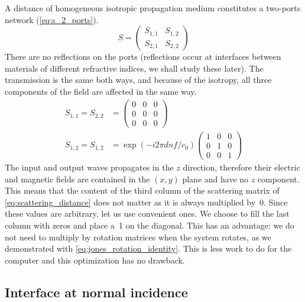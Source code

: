 A distance of homogeneous isotropic propagation medium constitutes a two-ports network (\cref{eq:s_2_ports}).
\begin{equation}
    S =
    \begin{pmatrix}
        S_{1, 1} & S_{1, 2} \\
        S_{2, 1} & S_{2, 2}
    \end{pmatrix}
    \label{eq:s_2_ports}
\end{equation}
There are no reflections on the ports (reflections occur at interfaces between materials of different refractive indices, we shall study these later).
The transmission is the same both ways, and because of the isotropy, all three components of the field are affected in the same way.
\begin{equation}
    \begin{aligned}
    S_{1, 1} = S_{2, 2} &=
    \begin{pmatrix}
        0 & 0 & 0 \\
        0 & 0 & 0 \\
        0 & 0 & 0
    \end{pmatrix}
    \\ 
    S_{1, 2} = S_{1, 2} &=
    \exp(- i 2\pi d n f / c_0)
    \begin{pmatrix}
        1 & 0 & 0 \\
        0 & 1 & 0 \\
        0 & 0 & 1
    \end{pmatrix}
    \end{aligned}
    \label{eq:scattering_distance}
\end{equation}
The input and output waves propagates in the $z$ direction, therefore their electric and magnetic fields are contained in the $(x, y)$ plane and have no $z$ component.
This means that the content of the third column of the scattering matrix of \cref{eq:scattering_distance} does not matter as it is always multiplied by~0.
Since these values are arbitrary, let us use convenient ones.
We choose to fill the last column with zeros and place a~1 on the diagonal. 
This has an advantage: we do not need to multiply by rotation matrices when the system rotates, as we demonstrated with \vref{eq:jones_rotation_identity}.
This is less work to do for the computer and this optimization has no drawback.



\subsection{Interface at normal incidence}
\label{sec:generic_networks_interface_at_normal_incidence}

